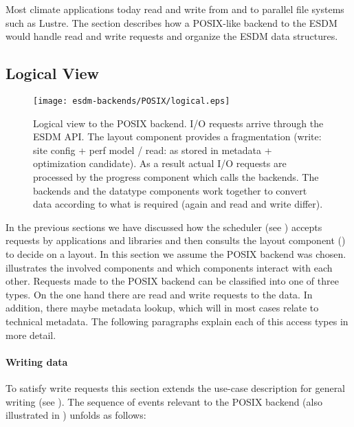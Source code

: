 
Most climate applications today read and write from and to parallel file systems such as Lustre.
The section describes how a POSIX-like backend to the ESDM would handle read and write requests and organize the ESDM data structures.


\subsection{Logical View}
\label{backend: posix/logical}

\begin{figure}
	\centering
	\texttt{[image: esdm-backends/POSIX/logical.eps]}
	\caption{Logical view to the POSIX backend. I/O requests arrive through the ESDM API. The layout component provides a fragmentation (write: site config + perf model / read: as stored in metadata + optimization candidate). As a result actual I/O requests are processed by the progress component which calls the backends. The backends and the datatype components work together to convert data according to what is required (again and read and write differ).}
	\label{fig:backend posix logical view}
\end{figure}

In the previous sections we have discussed how the scheduler (see ) accepts requests by applications and libraries and then consults the layout component () to decide on a layout.
In this section we assume the POSIX backend was chosen.
 illustrates the involved components and which components interact with each other.
Requests made to the POSIX backend can be classified into one of three types.
On the one hand there are read and write requests to the data.
In addition, there maybe metadata lookup, which will in most cases relate to technical metadata.
The following paragraphs explain each of this access types in more detail.


\paragraph{Writing data}
To satisfy write requests this section extends the use-case description for general writing (see ).
The sequence of events relevant to the POSIX backend (also illustrated in ) unfolds as follows:

